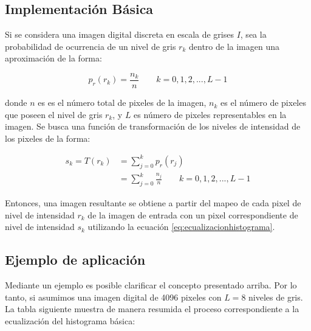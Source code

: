 \subsection{Implementación Básica}

Si se considera una imagen digital discreta en escala de grises $I$, sea la probabilidad de ocurrencia de un nivel de gris $r_k$ dentro de la imagen una aproximación de la forma:

\begin{equation}
p_r(r_k)= \frac{n_k}{n} \qquad k=0,1,2,...,L-1
\end{equation}

donde $n$ es es el número total de pixeles de la imagen, $n_k$ es el número de pixeles que poseen el nivel de gris $r_k$, y $L$ es número de pixeles representables en la imagen. Se busca una función de transformación de los niveles de intensidad de los pixeles de la forma:

\begin{equation}
\begin{split}
s_k=T(r_k) & = \sum_{j=0}^k p_r(r_j) \\
& = \sum_{j=0}^k \frac{n_j}{n} \qquad k=0,1,2,...,L-1
\end{split}
\label{eq:ecualizacionhistograma}
\end{equation}

Entonces, una imagen resultante se obtiene a partir del mapeo de cada pixel de nivel de intensidad $r_k$ de la imagen de entrada con un pixel correspondiente de nivel de intensidad $s_k$ utilizando la ecuación \ref{eq:ecualizacionhistograma}. 

\subsection{Ejemplo de aplicación}

Mediante un ejemplo es posible clarificar el concepto presentado arriba. Por lo tanto, si asumimos una imagen digital de 4096 pixeles con $L=8$ niveles de gris. La tabla siguiente muestra de manera resumida el proceso correspondiente a la ecualización del histograma básica:

